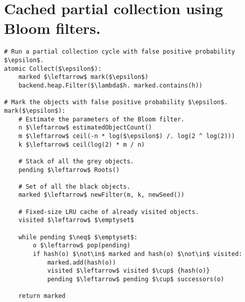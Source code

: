 \section{Cached partial collection using Bloom filters.}
\label{app:partial-bloom}

\centering
\begin{lstlisting}
# Run a partial collection cycle with false positive probability $\epsilon$.
atomic Collect($\epsilon$):
    marked $\leftarrow$ mark($\epsilon$)
    backend.heap.Filter($\lambda$h. marked.contains(h))

# Mark the objects with false positive probability $\epsilon$.
mark($\epsilon$):
    # Estimate the parameters of the Bloom filter.
    n $\leftarrow$ estimatedObjectCount()
    m $\leftarrow$ ceil(-n * log($\epsilon$) /. log(2 ^ log(2)))
    k $\leftarrow$ ceil(log(2) * m / n)

    # Stack of all the grey objects.
    pending $\leftarrow$ Roots()

    # Set of all the black objects.
    marked $\leftarrow$ newFilter(m, k, newSeed())

    # Fixed-size LRU cache of already visited objects.
    visited $\leftarrow$ $\emptyset$

    while pending $\neq$ $\emptyset$:
        o $\leftarrow$ pop(pending)
        if hash(o) $\not\in$ marked and hash(o) $\not\in$ visited:
            marked.add(hash(o))
            visited $\leftarrow$ visited $\cup$ {hash(o)}
            pending $\leftarrow$ pending $\cup$ successors(o)

    return marked
\end{lstlisting}
